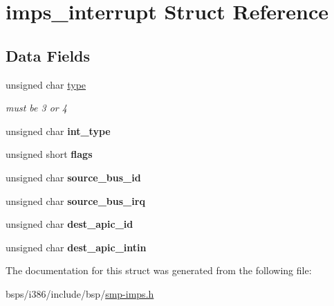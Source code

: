 \hypertarget{structimps__interrupt}{}\section{imps\+\_\+interrupt Struct Reference}
\label{structimps__interrupt}
\subsection*{Data Fields}
\begin{DoxyCompactItemize}
\item 
\mbox{\label{structimps__interrupt_a93de3928b0e8baf3b125e103a274901c}} 
unsigned char \mbox{\hyperlink{structimps__interrupt_a93de3928b0e8baf3b125e103a274901c}{type}}
\begin{DoxyCompactList}\small\item\em must be 3 or 4 \end{DoxyCompactList}\item 
\mbox{\label{structimps__interrupt_a42eb860e919840ed16e9c7255b081a0a}} 
unsigned char {\bfseries int\+\_\+type}
\item 
\mbox{\label{structimps__interrupt_ad2a40f77580126ce2aee48105b8af585}} 
unsigned short {\bfseries flags}
\item 
\mbox{\label{structimps__interrupt_ad8883d80fc14ba1a6195b0bd81ad3907}} 
unsigned char {\bfseries source\+\_\+bus\+\_\+id}
\item 
\mbox{\label{structimps__interrupt_a7f2625ac479eaaea8fca3020c10efa0b}} 
unsigned char {\bfseries source\+\_\+bus\+\_\+irq}
\item 
\mbox{\label{structimps__interrupt_ae7228ac6e7c1e1b0a92c34916a2e21c2}} 
unsigned char {\bfseries dest\+\_\+apic\+\_\+id}
\item 
\mbox{\label{structimps__interrupt_a384ff96c92563898d2af56fd15979e79}} 
unsigned char {\bfseries dest\+\_\+apic\+\_\+intin}
\end{DoxyCompactItemize}


The documentation for this struct was generated from the following file\+:\begin{DoxyCompactItemize}
\item 
bsps/i386/include/bsp/\mbox{\hyperlink{smp-imps_8h}{smp-\/imps.\+h}}\end{DoxyCompactItemize}
